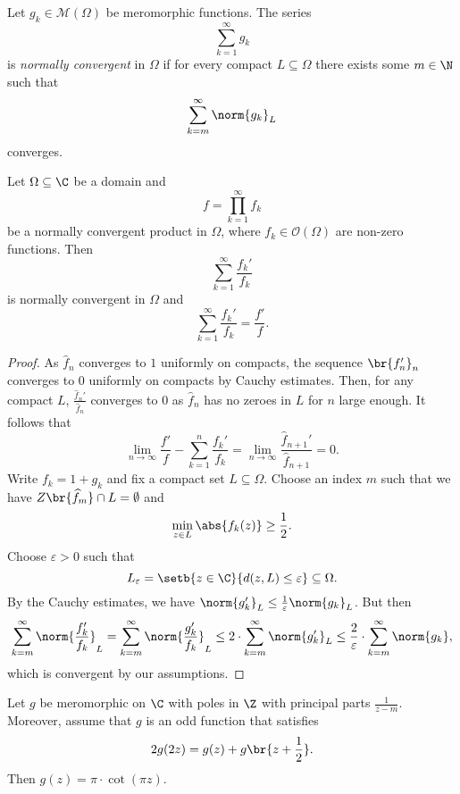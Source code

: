 \begin{definicija}
Let $g_k \in \mathcal{M}(\Omega)$ be meromorphic functions. The
series
\[
\sum_{k=1}^\infty g_k
\]
is \emph{normally convergent} in $\Omega$
if for every compact $L \subseteq \Omega$ there exists some
$m \in \N$ such that
\[
\sum_{k=m}^\infty \norm{g_k}_L
\]
converges.
\end{definicija}

\begin{izrek}
Let $\Omega \subseteq \C$ be a domain and
\[
f = \prod_{k=1}^\infty f_k
\]
be a normally convergent product in $\Omega$, where
$f_k \in \mathcal{O}(\Omega)$ are non-zero functions. Then
\[
\sum_{k=1}^\infty \frac{f_k'}{f_k}
\]
is normally convergent in $\Omega$ and
\[
\sum_{k=1}^\infty \frac{f_k'}{f_k} = \frac{f'}{f}.
\]
\end{izrek}

\begin{proof}
As $\widehat{f}_n$ converges to $1$ uniformly on compacts, the
sequence $\br{f_n'}_n$ converges to $0$ uniformly on compacts by
Cauchy estimates. Then, for any compact $L$,
$\frac{\widehat{f}_n'}{\widehat{f}_n}$ converges to $0$ as
$\widehat{f}_n$ has no zeroes in $L$ for $n$ large enough. It
follows that
\[
\lim_{n \to \infty} \frac{f'}{f} - \sum_{k=1}^n \frac{f_k'}{f_k} =
\lim_{n \to \infty} \frac{\widehat{f}_{n+1}'}{\widehat{f}_{n+1}} =
0.
\]
Write $f_k = 1 + g_k$ and fix a compact set $L \subseteq \Omega$.
Choose an index $m$ such that we have
$Z \br{\widehat{f}_m} \cap L = \emptyset$ and
\[
\min_{z \in L} \abs{f_k(z)} \geq \frac{1}{2}.
\]
Choose $\varepsilon > 0$ such that
\[
L_\varepsilon =
\setb{z \in \C}{d(z, L) \leq \varepsilon} \subseteq
\Omega.
\]
By the Cauchy estimates, we have
$\norm{g_k'}_L \leq \frac{1}{\varepsilon} \norm{g_k}_L$. But then
\[
\sum_{k=m}^\infty \norm{\frac{f_k'}{f_k}}_L =
\sum_{k=m}^\infty \norm{\frac{g_k'}{f_k}}_L \leq
2 \cdot \sum_{k=m}^\infty \norm{g_k'}_L \leq
\frac{2}{\varepsilon} \cdot \sum_{k=m}^\infty \norm{g_k},
\]
which is convergent by our assumptions.
\end{proof}

\begin{lema}
Let $g$ be meromorphic on $\C$ with poles in $\Z$ with principal
parts $\frac{1}{z-m}$. Moreover, assume that $g$ is an odd
function that satisfies
\[
2 g(2z) = g(z) + g \br{z + \frac{1}{2}}.
\]
Then $g(z) = \pi \cdot \cot(\pi z)$.
\end{lema}

